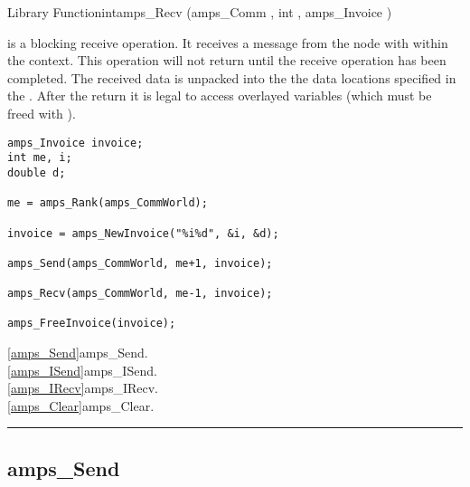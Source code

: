 \begin{deftypefn}{Library Function}{int}{amps\_Recv}
(amps_Comm , int , amps_Invoice ) 

\DESCRIPTION

 is a blocking receive operation.  It receives a message
from the node with  within the  context.  This
operation will not return until the receive operation has been
completed.  The received data is unpacked into the the data locations
specified in the .  After the return it is legal to access
overlayed variables (which must be freed with ).

\EXAMPLE

\begin{display}\begin{verbatim}
amps_Invoice invoice;
int me, i;
double d;

me = amps_Rank(amps_CommWorld);

invoice = amps_NewInvoice("%i%d", &i, &d);

amps_Send(amps_CommWorld, me+1, invoice);

amps_Recv(amps_CommWorld, me-1, invoice);

amps_FreeInvoice(invoice);
\end{verbatim}\end{display}

\SEEALSO
\vref{amps_Send}{amps\_Send}. \\
\vref{amps_ISend}{amps\_ISend}. \\
\vref{amps_IRecv}{amps\_IRecv}. \\
\vref{amps_Clear}{amps\_Clear}. \\

\end{deftypefn}


\noindent\rule{\textwidth}{1mm}

\subsection{amps\_Send}
\label{amps_Send}

